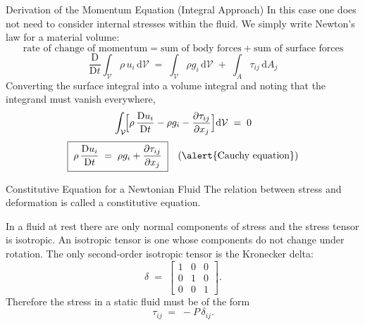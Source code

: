 \documentclass[10pt,aspectratio=43]{beamer}
\newcommand{\dd}{\mathrm{d}}
\newcommand{\D}{\mathrm{D}}
\newcommand{\pd}[2]{\frac{\partial #1}{\partial #2}}
\newcommand{\Vol}{\mathcal{V}}
\begin{document}
\begin{frame}{Derivation of the Momentum Equation (Integral Approach)}
  In this case one does not need to consider internal stresses within the
  fluid. We simply write Newton's law for a material volume:
  \[
    \text{rate of change of momentum}
      = \text{sum of body forces} + \text{sum of surface forces}
  \]
  \[
    \frac{\D}{\D t}\!\int_{\Vol}\!\rho\,u_{i}\,\dd\Vol
      \;=\; \int_{\Vol}\!\rho g_{i}\,\dd\Vol \;+\; \int_{A}\!\tau_{ij}\,\dd A_{j}
  \]
  Converting the surface integral into a volume integral and noting that
  the integrand must vanish everywhere,
  \[
    \int_{\Vol}\!\Bigl[\rho\,\frac{\D u_{i}}{\D t} - \rho g_{i} - \pd{\tau_{ij}}{x_{j}}\Bigr]\dd\Vol \;=\; 0
  \]
  \[
    \boxed{\;\rho\,\frac{\D u_{i}}{\D t} \;=\; \rho g_{i} + \pd{\tau_{ij}}{x_{j}}\;}
    \quad\text{(\alert{Cauchy equation})}
  \]
\end{frame}

\begin{frame}{Constitutive Equation for a Newtonian Fluid}
  The relation between stress and deformation is called a \alert{constitutive
  equation}.

  \medskip
  In a fluid at rest there are only normal components of stress and the
  stress tensor is isotropic. An isotropic tensor is one whose components
  do not change under rotation. The only second-order isotropic tensor is
  the Kronecker delta:
  \[
    \delta \;=\;
    \begin{bmatrix}
      1 & 0 & 0 \\
      0 & 1 & 0 \\
      0 & 0 & 1
    \end{bmatrix}.
  \]
  Therefore the stress in a static fluid must be of the form
  \[
    \tau_{ij} \;=\; -P\,\delta_{ij}.
  \]
\end{frame}
\end{document}

